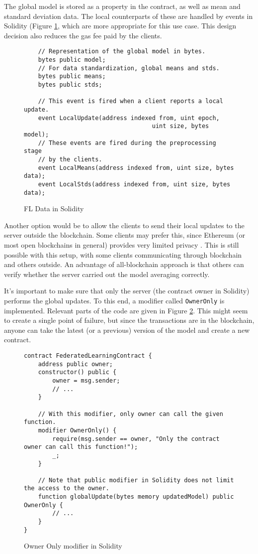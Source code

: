 The global model is stored as a property in the contract, as well as mean and standard deviation data.
The local counterparts of these are handled by events in Solidity (Figure \ref{fig:flsol}, which are more appropriate for this use case.
This design decision also reduces the gas fee paid by the clients.

\begin{figure}[h]
    \begin{verbatim}
    // Representation of the global model in bytes.
    bytes public model;
    // For data standardization, global means and stds.
    bytes public means;
    bytes public stds;

    // This event is fired when a client reports a local update.
    event LocalUpdate(address indexed from, uint epoch, 
                                    uint size, bytes model);
    // These events are fired during the preprocessing stage
    // by the clients.
    event LocalMeans(address indexed from, uint size, bytes data);
    event LocalStds(address indexed from, uint size, bytes data);
    \end{verbatim}
    \caption{FL Data in Solidity}
    \label{fig:flsol}
\end{figure}

Another option would be to allow the clients to send their local updates to the server outside the blockchain.
Some clients may prefer this, since Ethereum (or most open blockchains in general) provides very limited privacy \citep{Tikhomirov2017EthereumSO}.
This is still possible with this setup, with some clients communicating through blockchain and others outside.
An advantage of all-blockchain approach is that others can verify whether the server carried out the model averaging correctly.


It's important to make sure that only the server (the contract owner in Solidity) performs the global updates.
To this end, a modifier called \verb|OwnerOnly| is implemented.
Relevant parts of the code are given in Figure \ref{fig:owneronly}.
This might seem to create a single point of failure, but since the transactions are in the blockchain, anyone can take the latest (or a previous) version of the model and create a new contract.

\begin{figure}[h]
    \begin{verbatim}
contract FederatedLearningContract {
    address public owner;
    constructor() public {
        owner = msg.sender;
        // ...
    }

    // With this modifier, only owner can call the given function.
    modifier OwnerOnly() {
        require(msg.sender == owner, "Only the contract owner can call this function!");
        _;
    }

    // Note that public modifier in Solidity does not limit the access to the owner.
    function globalUpdate(bytes memory updatedModel) public OwnerOnly {
        // ...
    }
}
    \end{verbatim}
    \caption{Owner Only modifier in Solidity}
    \label{fig:owneronly}
\end{figure}


